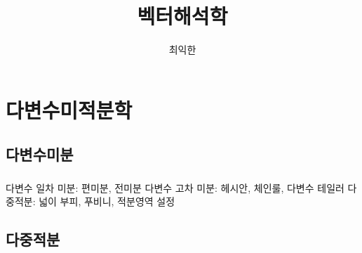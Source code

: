 \documentclass{../../large}
\begin{document}
\title{벡터해석학}
\author{최익한}
\maketitle
\tableofcontents



\part{다변수미적분학}


\chapter{다변수미분}

\section{}
\section{}
\section{}
\section{}

다변수 일차 미분: 편미분, 전미분
다변수 고차 미분: 헤시안, 체인룰, 다변수 테일러
다중적분: 넓이 부피, 푸비니, 적분영역 설정



\chapter{다중적분}

\section{}
\section{}
\section{}
\section{}
\end{document}
